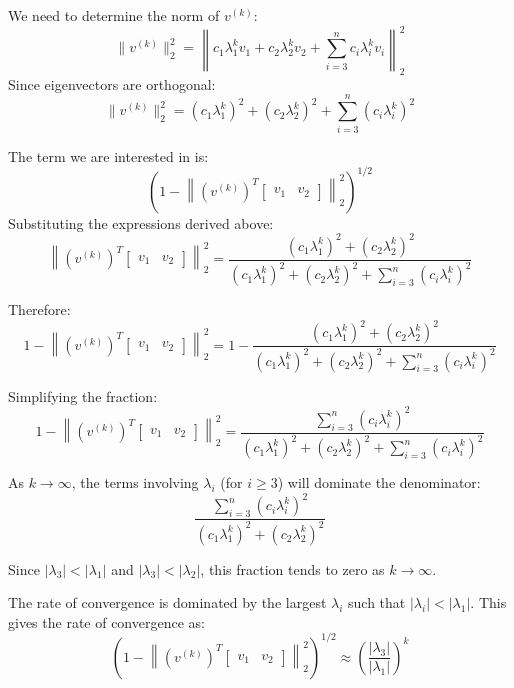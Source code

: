 \documentclass[11pt,onecolumn]{article}
\begin{document}
\begin{enumerate}[label=(\alph*)]
	      We need to determine the norm of \(v^{(k)}\):
	      \[
		      \|v^{(k)}\|_2^2 = \left\|c_1\lambda_1^k v_1 + c_2\lambda_2^k v_2 + \sum_{i=3}^{n} c_i \lambda_i^k v_i\right\|_2^2
	      \]
	      Since eigenvectors are orthogonal:
	      \[
		      \|v^{(k)}\|_2^2 = \left(c_1 \lambda_1^k\right)^2 + \left(c_2 \lambda_2^k\right)^2 + \sum_{i=3}^{n} \left(c_i \lambda_i^k\right)^2
	      \]

	      The term we are interested in is:
	      \[
		      \left(1 - \left\|\left(v^{(k)}\right)^T \begin{bmatrix} v_1 & v_2 \end{bmatrix}\right\|_2^2\right)^{1/2}
	      \]
	      Substituting the expressions derived above:
	      \[
		      \left\|\left(v^{(k)}\right)^T \begin{bmatrix} v_1 & v_2 \end{bmatrix}\right\|_2^2 = \frac{\left(c_1 \lambda_1^k\right)^2 + \left(c_2 \lambda_2^k\right)^2}{\left(c_1 \lambda_1^k\right)^2 + \left(c_2 \lambda_2^k\right)^2 + \sum_{i=3}^{n} \left(c_i \lambda_i^k\right)^2}
	      \]

	      Therefore:
	      \[
		      1 - \left\|\left(v^{(k)}\right)^T \begin{bmatrix} v_1 & v_2 \end{bmatrix}\right\|_2^2 = 1 - \frac{\left(c_1 \lambda_1^k\right)^2 + \left(c_2 \lambda_2^k\right)^2}{\left(c_1 \lambda_1^k\right)^2 + \left(c_2 \lambda_2^k\right)^2 + \sum_{i=3}^{n} \left(c_i \lambda_i^k\right)^2}
	      \]

	      Simplifying the fraction:
	      \[
		      1 - \left\|\left(v^{(k)}\right)^T \begin{bmatrix} v_1 & v_2 \end{bmatrix}\right\|_2^2 = \frac{\sum_{i=3}^{n} \left(c_i \lambda_i^k\right)^2}{\left(c_1 \lambda_1^k\right)^2 + \left(c_2 \lambda_2^k\right)^2 + \sum_{i=3}^{n} \left(c_i \lambda_i^k\right)^2}
	      \]

	      As $k \to \infty$, the terms involving $\lambda_i$ (for $i \ge 3$) will dominate the denominator:
	      \[
		      \frac{\sum_{i=3}^{n} \left(c_i \lambda_i^k\right)^2}{\left(c_1 \lambda_1^k\right)^2 + \left(c_2 \lambda_2^k\right)^2}
	      \]

	      Since $\left|\lambda_3\right| < \left|\lambda_1\right|$ and $\left|\lambda_3\right| < \left|\lambda_2\right|$, this fraction tends to zero as $k \to \infty$.

	      The rate of convergence is dominated by the largest $\lambda_i$ such that $|\lambda_i| < |\lambda_1|$. This gives the rate of convergence as:
	      \[
		      \left(1 - \left\|\left(v^{(k)}\right)^T \begin{bmatrix} v_1 & v_2 \end{bmatrix}\right\|_2^2\right)^{1/2} \approx \left(\frac{|\lambda_3|}{|\lambda_1|}\right)^k
	      \]


\end{enumerate}
\end{document}
